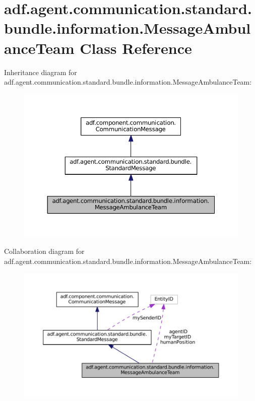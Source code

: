 \hypertarget{classadf_1_1agent_1_1communication_1_1standard_1_1bundle_1_1information_1_1MessageAmbulanceTeam}{}\section{adf.\+agent.\+communication.\+standard.\+bundle.\+information.\+Message\+Ambulance\+Team Class Reference}
\label{classadf_1_1agent_1_1communication_1_1standard_1_1bundle_1_1information_1_1MessageAmbulanceTeam}


Inheritance diagram for adf.\+agent.\+communication.\+standard.\+bundle.\+information.\+Message\+Ambulance\+Team\+:
\nopagebreak
\begin{figure}[H]
\begin{center}
\leavevmode
\includegraphics[width=350pt]{classadf_1_1agent_1_1communication_1_1standard_1_1bundle_1_1information_1_1MessageAmbulanceTeam__inherit__graph}
\end{center}
\end{figure}


Collaboration diagram for adf.\+agent.\+communication.\+standard.\+bundle.\+information.\+Message\+Ambulance\+Team\+:
\nopagebreak
\begin{figure}[H]
\begin{center}
\leavevmode
\includegraphics[width=350pt]{classadf_1_1agent_1_1communication_1_1standard_1_1bundle_1_1information_1_1MessageAmbulanceTeam__coll__graph}
\end{center}
\end{figure}
